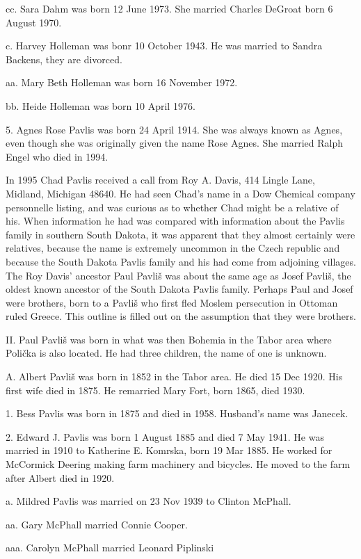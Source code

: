 \documentclass[a4paper]{article}
\begin{document}
cc. Sara Dahm was born 12 June 1973.  She married Charles DeGroat born 6 August 1970.

c. Harvey Holleman was bonr 10 October 1943.  He was married to Sandra Backens, they are divorced.

aa. Mary Beth Holleman was born 16 November 1972.

bb. Heide Holleman was born 10 April 1976.

5. Agnes Rose Pavlis was born 24 April 1914.  She was always known as Agnes, even though she was originally given the name Rose Agnes.  She married Ralph Engel who died in 1994.

	In 1995 Chad Pavlis received a call from Roy A. Davis, 414 Lingle Lane, Midland, Michigan 48640.  He had seen Chad's name in a Dow Chemical company personnelle listing, and was curious as to whether Chad might be a relative of his.  When information he had was compared with information about the Pavlis family in southern South Dakota, it was apparent that they almost certainly were relatives, because the name is extremely uncommon in the Czech republic and because the South Dakota Pavlis family and his had come from adjoining villages.  
	The  Roy Davis' ancestor Paul Pavli\v{s} was about the same age as Josef Pavli\v{s}, the oldest known ancestor of the South Dakota Pavlis family.   Perhaps Paul and Josef were brothers, born to a Pavli\v{s} who first fled Moslem persecution in Ottoman ruled Greece.  This outline is filled out on the  assumption that they were brothers. 

II. Paul Pavli\v{s} was born in what was then Bohemia in the Tabor area where Poli\v{c}ka is also located.  He had three children, the name of one is unknown.

A. Albert Pavli\v{s} was born in 1852 in the Tabor area.  He died 15 Dec 1920.  His first wife died in 1875.  He remarried Mary Fort, born 1865, died 1930.  

1. Bess Pavlis was born in 1875 and died in 1958.  Husband's name was Janecek.

2. Edward J. Pavlis was born 1 August 1885 and died 7 May 1941.  He was married in 1910 to Katherine E. Komrska, born 19 Mar 1885.  He worked for McCormick Deering making farm machinery and bicycles.  He moved to the farm after Albert died in 1920.  

a. Mildred Pavlis was married on 23 Nov 1939 to Clinton McPhall.

aa. Gary McPhall married Connie Cooper.

aaa. Carolyn McPhall married Leonard Piplinski
		
\end{document}
